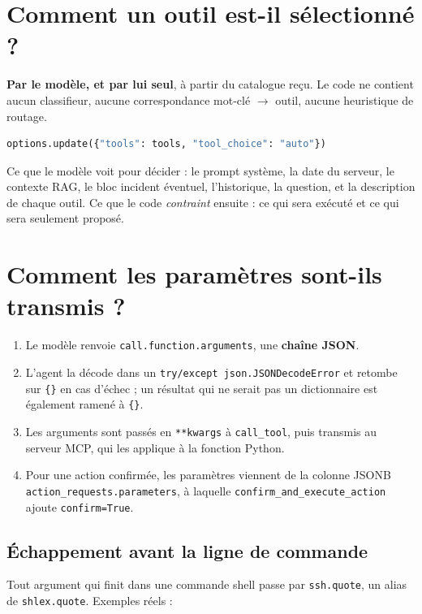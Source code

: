 \documentclass[11pt,a4paper]{report}
\newcommand{\fn}[1]{\texttt{\small\textcolor{oasisviolet}{#1}}}
\newcommand{\arrowto}{\ensuremath{\rightarrow}}
\begin{document}
\section{Comment un outil est-il sélectionné ?}

\textbf{Par le modèle, et par lui seul}, à partir du catalogue reçu. Le code ne
contient aucun classifieur, aucune correspondance mot-clé \arrowto{} outil,
aucune heuristique de routage.

\begin{lstlisting}[language=Python,caption={La seule instruction de sélection}]
options.update({"tools": tools, "tool_choice": "auto"})
\end{lstlisting}

\noindent
Ce que le modèle voit pour décider : le prompt système, la date du serveur, le
contexte RAG, le bloc incident éventuel, l'historique, la question, et la
description de chaque outil. Ce que le code \emph{contraint} ensuite : ce qui
sera exécuté et ce qui sera seulement proposé.

\section{Comment les paramètres sont-ils transmis ?}

\begin{enumerate}
  \item Le modèle renvoie \texttt{call.function.arguments}, une \textbf{chaîne
  JSON}.
  \item L'agent la décode dans un \texttt{try/except json.JSONDecodeError} et
  retombe sur \texttt{\{\}} en cas d'échec ; un résultat qui ne serait pas un
  dictionnaire est également ramené à \texttt{\{\}}.
  \item Les arguments sont passés en \texttt{**kwargs} à \fn{call\_tool}, puis
  transmis au serveur MCP, qui les applique à la fonction Python.
  \item Pour une action confirmée, les paramètres viennent de la colonne JSONB
  \texttt{action\_requests.parameters}, à laquelle
  \fn{confirm\_and\_execute\_action} ajoute \texttt{confirm=True}.
\end{enumerate}

\subsection*{Échappement avant la ligne de commande}
Tout argument qui finit dans une commande shell passe par \fn{ssh.quote}, un
alias de \texttt{shlex.quote}. Exemples réels :
\end{document}
